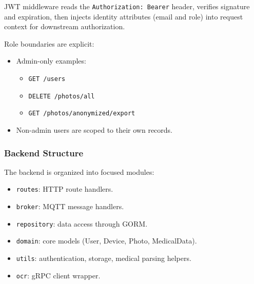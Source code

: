 \documentclass[12pt,a4paper]{article}
\begin{document}
    JWT middleware reads the \texttt{Authorization: Bearer} header, verifies
    signature and expiration, then injects identity attributes (email and role)
    into request context for downstream authorization.

    Role boundaries are explicit:
    \begin{itemize}[leftmargin=*]
        \item Admin-only examples:
        \begin{itemize}[leftmargin=*]
            \item \texttt{GET /users}
            \item \texttt{DELETE /photos/all}
            \item \texttt{GET /photos/anonymized/export}
        \end{itemize}
        \item Non-admin users are scoped to their own records.
    \end{itemize}

    \subsubsection{Backend Structure}
    The backend is organized into focused modules:
    \begin{itemize}[leftmargin=*]
        \item \texttt{routes}: HTTP route handlers.
        \item \texttt{broker}: MQTT message handlers.
        \item \texttt{repository}: data access through GORM.
        \item \texttt{domain}: core models (User, Device, Photo, MedicalData).
        \item \texttt{utils}: authentication, storage, medical parsing helpers.
        \item \texttt{ocr}: gRPC client wrapper.
    \end{itemize}
\end{document}
